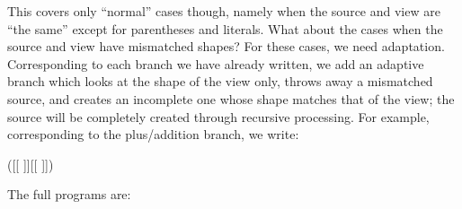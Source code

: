 This covers only ``normal'' cases though, namely when the source and view are ``the same'' except for parentheses and literals.
What about the cases when the source and view have mismatched shapes?
For these cases, we need adaptation.
Corresponding to each branch we have already written, we add an adaptive branch which looks at the shape of the view only, throws away a mismatched source, and creates an incomplete one whose shape matches that of the view; the source will be completely created through recursive processing.
For example, corresponding to the plus/addition branch, we write:
\begin{hscode}\SaveRestoreHook
{}%
%
%
\>[B]{}{^\$}(\;[\kern-1.5pt[\,\anonymous \,]\kern-1.5pt]\;[\kern-1.5pt[\,\;\anonymous \;\anonymous \,]\kern-1.5pt]){}\<[E]%
\\
\>[B]{}\<[3]%
\>[3]{}\Longrightarrow\lambda \anonymous \;\anonymous \to {}\;\;\<[E]%
\ColumnHook
\end{hscode}\resethooks
The full programs are:
